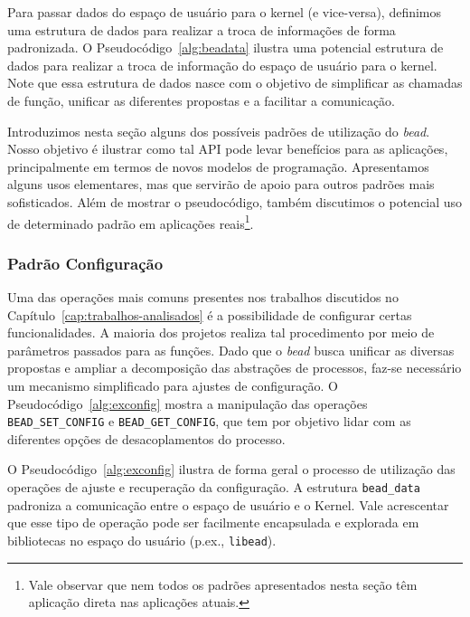 

Para passar dados do espaço de usuário para o kernel (e vice-versa), definimos
uma estrutura de dados para realizar a troca de informações de forma
padronizada. O Pseudocódigo~\ref{alg:beadata} ilustra uma potencial estrutura
de dados para realizar a troca de informação do espaço de usuário para o kernel.
Note que essa estrutura de dados nasce com o objetivo de simplificar as
chamadas de função, unificar as diferentes propostas e a facilitar a
comunicação.



Introduzimos nesta seção alguns dos possíveis padrões de utilização do
\emph{bead}. Nosso objetivo é ilustrar como tal API pode levar benefícios para
as aplicações, principalmente em termos de novos modelos de programação.
Apresentamos alguns usos elementares, mas que servirão de apoio para outros
padrões mais sofisticados. Além de mostrar o pseudocódigo, também discutimos o
potencial uso de determinado padrão em aplicações reais\footnote{Vale observar
que nem todos os padrões apresentados nesta seção têm aplicação direta nas
aplicações atuais.}.

\subsubsection{Padrão Configuração}

Uma das operações mais comuns presentes nos trabalhos discutidos no
Capítulo~\ref{cap:trabalhos-analisados} é a possibilidade de configurar certas
funcionalidades. A maioria dos projetos realiza tal procedimento por meio de
parâmetros passados para as funções. Dado que o \emph{bead} busca unificar as
diversas propostas e ampliar a decomposição das abstrações de processos, faz-se
necessário um mecanismo simplificado para ajustes de configuração. O
Pseudocódigo~\ref{alg:exconfig} mostra a manipulação das operações
\texttt{BEAD\_SET\_CONFIG} e \texttt{BEAD\_GET\_CONFIG}, que tem por objetivo
lidar com as diferentes opções de desacoplamentos do processo.



O Pseudocódigo~\ref{alg:exconfig} ilustra de forma geral o processo de
utilização das operações de ajuste e recuperação da configuração. A
estrutura \texttt{bead\_data} padroniza a comunicação entre o espaço de usuário
e o Kernel. Vale acrescentar que esse tipo de operação pode ser facilmente
encapsulada e explorada em bibliotecas no espaço do usuário (p.ex.,
\texttt{libead}).


